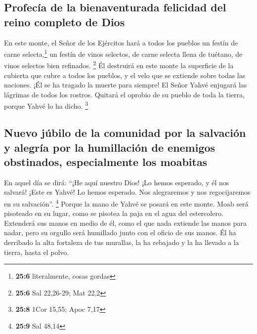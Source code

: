 \begin{paracol}{2}
\hypertarget{profecuxeda-de-la-bienaventurada-felicidad-del-reino-completo-de-dios}{%
\subsection{Profecía de la bienaventurada felicidad del reino completo
de
Dios}\label{profecuxeda-de-la-bienaventurada-felicidad-del-reino-completo-de-dios}}

 En este monte, el Señor de los Ejércitos hará a todos los
pueblos un festín de carne selecta,\footnote{\textbf{25:6} literalmente,
  cosas gordas} un festín de vinos selectos, de carne selecta llena de
tuétano, de vinos selectos bien refinados. \footnote{\textbf{25:6} Sal
  22,26-29; Mat 22,2}  Él destruirá en este monte la
superficie de la cubierta que cubre a todos los pueblos, y el velo que
se extiende sobre todas las naciones.  ¡Él se ha tragado
la muerte para siempre! El Señor Yahvé enjugará las lágrimas de todos
los rostros. Quitará el oprobio de su pueblo de toda la tierra, porque
Yahvé lo ha dicho. \footnote{\textbf{25:8} 1Cor 15,55; Apoc 7,17}

\hypertarget{nuevo-juxfabilo-de-la-comunidad-por-la-salvaciuxf3n-y-alegruxeda-por-la-humillaciuxf3n-de-enemigos-obstinados-especialmente-los-moabitas}{%
\subsection{Nuevo júbilo de la comunidad por la salvación y alegría por
la humillación de enemigos obstinados, especialmente los
moabitas}\label{nuevo-juxfabilo-de-la-comunidad-por-la-salvaciuxf3n-y-alegruxeda-por-la-humillaciuxf3n-de-enemigos-obstinados-especialmente-los-moabitas}}

 En aquel día se dirá: ``¡He aquí nuestro Dios! ¡Lo hemos
esperado, y él nos salvará! ¡Este es Yahvé! Lo hemos esperado. Nos
alegraremos y nos regocijaremos en su salvación''. \footnote{\textbf{25:9}
  Sal 48,14}  Porque la mano de Yahvé se posará en este
monte. Moab será pisoteado en su lugar, como se pisotea la paja en el
agua del estercolero.  Extenderá sus manos en medio de
él, como el que nada extiende las manos para nadar, pero su orgullo será
humillado junto con el oficio de sus manos.  Él ha
derribado la alta fortaleza de tus murallas, la ha rebajado y la ha
llevado a la tierra, hasta el polvo.

\switchcolumn
\begin{otherlanguage}{english}


\end{otherlanguage}
\end{paracol}
